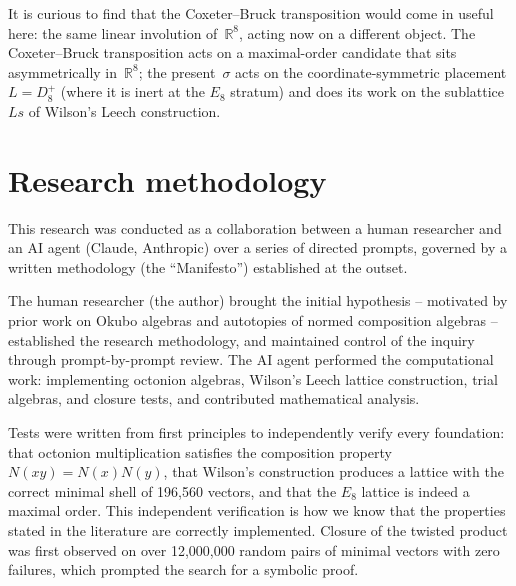 \documentclass[twoside,english]{paper}
\numberwithin{equation}{section}
\numberwithin{figure}{section}
\theoremstyle{definition}
\theoremstyle{remark}
\newcommand{\RR}{\mathbb{R}}
\newcommand{\Nrm}{N}                  %
\begin{document}
It is curious to find that the Coxeter--Bruck transposition would
come in useful here: the same linear involution of~$\RR^8$, acting
now on a different object.  The Coxeter--Bruck transposition acts
on a maximal-order candidate that sits asymmetrically in~$\RR^8$;
the present~$\sigma$ acts on the coordinate-symmetric placement
$L = D_8^+$ (where it is inert at the $E_8$ stratum) and does its
work on the sublattice~$Ls$ of Wilson's Leech construction.

\section{Research methodology}\label{sec:methodology}

This research was conducted as a collaboration between a human
researcher and an AI agent (Claude, Anthropic) over a series of
directed prompts, governed by a written methodology (the
``Manifesto'') established at the outset.

The human researcher (the author) brought the initial hypothesis --
motivated by prior work on Okubo algebras and autotopies of normed
composition algebras -- established the research methodology, and
maintained control of the inquiry through prompt-by-prompt review.
The AI agent performed the computational work: implementing octonion
algebras, Wilson's Leech lattice construction, trial algebras, and
closure tests, and contributed mathematical analysis.

Tests were written from first principles to independently verify
every foundation: that octonion multiplication satisfies the
composition property $\Nrm(xy) = \Nrm(x)\Nrm(y)$, that Wilson's
construction produces a lattice with the correct minimal shell of
196{,}560 vectors, and that the $E_8$ lattice is indeed a maximal
order.  This independent verification is how we know that the
properties stated in the literature are correctly implemented.
Closure of the twisted product was first observed on over
12{,}000{,}000 random pairs of minimal vectors with zero failures,
which prompted the search for a symbolic proof.
\end{document}
